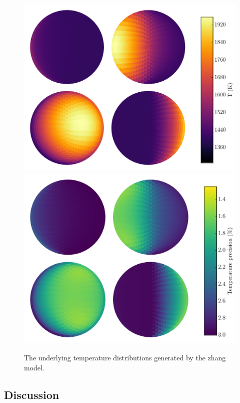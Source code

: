 \documentclass[a4paper,fleqn,usenatbib]{mnras}
\begin{document}
\begin{figure}
\begin{center}
\includegraphics[width=\columnwidth]{img/free_parameterstemp_map.pdf}
\includegraphics[width=\columnwidth]{img/free_parameterstemp_errs.pdf}
\caption{The underlying temperature distributions generated by the zhang model.}
\label{fig:best_fit_temp}
\end{center}
\end{figure}

\subsection{Discussion}\label{sec:Discussion}
\end{document}
